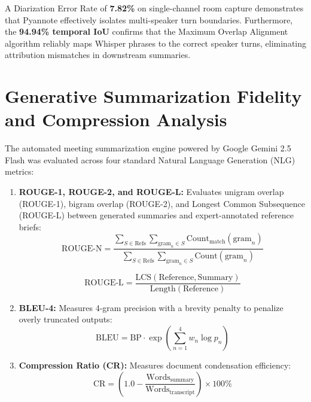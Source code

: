 \documentclass[12pt,oneside,letterpaper]{report}
\numberwithin{equation}{chapter} %
\begin{document}
A Diarization Error Rate of \textbf{7.82\%} on single-channel room capture demonstrates that Pyannote effectively isolates multi-speaker turn boundaries. Furthermore, the \textbf{94.94\% temporal IoU} confirms that the Maximum Overlap Alignment algorithm reliably maps Whisper phrases to the correct speaker turns, eliminating attribution mismatches in downstream summaries.

\section{Generative Summarization Fidelity and Compression Analysis}
The automated meeting summarization engine powered by Google Gemini 2.5 Flash was evaluated across four standard Natural Language Generation (NLG) metrics:

\begin{enumerate}
    \item \textbf{ROUGE-1, ROUGE-2, and ROUGE-L:} Evaluates unigram overlap (ROUGE-1), bigram overlap (ROUGE-2), and Longest Common Subsequence (ROUGE-L) between generated summaries and expert-annotated reference briefs:
    \begin{equation}
    \text{ROUGE-N} = \frac{\sum_{S \in \text{Refs}} \sum_{\text{gram}_n \in S} \text{Count}_{\text{match}}(\text{gram}_n)}{\sum_{S \in \text{Refs}} \sum_{\text{gram}_n \in S} \text{Count}(\text{gram}_n)}
    \label{eq:rouge_n}
    \end{equation}

    \begin{equation}
    \text{ROUGE-L} = \frac{\text{LCS}(\text{Reference}, \text{Summary})}{\text{Length}(\text{Reference})}
    \label{eq:rouge_l}
    \end{equation}

    \item \textbf{BLEU-4:} Measures 4-gram precision with a brevity penalty to penalize overly truncated outputs:
    \begin{equation}
    \text{BLEU} = \text{BP} \cdot \exp\left(\sum_{n=1}^4 w_n \log p_n\right)
    \label{eq:bleu_4}
    \end{equation}

    \item \textbf{Compression Ratio (CR):} Measures document condensation efficiency:
    \begin{equation}
    \text{CR} = \left(1.0 - \frac{\text{Words}_{\text{summary}}}{\text{Words}_{\text{transcript}}}\right) \times 100\%
    \label{eq:compression_ratio}
    \end{equation}
\end{enumerate}
\end{document}
